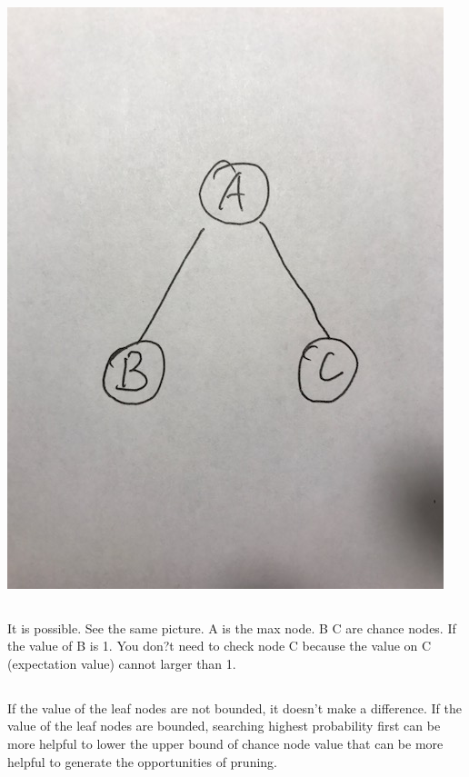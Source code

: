 \documentclass[12pt]{article}
\begin{document}
		\paragraph{}
			\includegraphics[scale=0.2]{3137.jpg}
			
	
	\subsection{}
		\paragraph{}
It is possible. See the same picture. A is the max node. B C are chance nodes. If the value of B is 1. You don?t need to check node C because the value on C (expectation value) cannot larger than 1.

		
	
	\subsection{}
		\paragraph{}
If the value of the leaf nodes are not bounded, it doesn't make a difference. If the value of the leaf nodes are bounded, searching highest probability first can be more helpful to lower the upper bound of chance node value that can be more helpful to generate the opportunities of pruning. 
		
\end{document}
